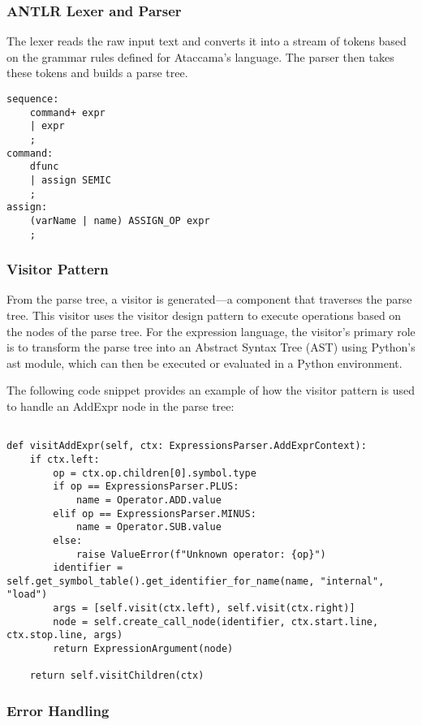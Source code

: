 \subsubsection{ANTLR Lexer and Parser}

The lexer reads the raw input text and converts it into a stream of tokens based on the grammar rules defined for Ataccama’s language. The parser then takes these tokens and builds a parse tree.


\begin{verbatim}
sequence:
    command+ expr
    | expr
    ;
command:
    dfunc
    | assign SEMIC
    ;
assign:
    (varName | name) ASSIGN_OP expr
    ;
\end{verbatim}

\subsubsection{Visitor Pattern}
 From the parse tree, a visitor is generated—a component that traverses the parse tree. This visitor uses the visitor design pattern to execute operations based on the nodes of the parse tree. For the expression language, the visitor's primary role is to transform the parse tree into an Abstract Syntax Tree (AST) using Python’s ast module, which can then be executed or evaluated in a Python environment.

The following code snippet provides an example of how the visitor pattern is used to handle an AddExpr node in the parse tree:

\begin{verbatim}
    
def visitAddExpr(self, ctx: ExpressionsParser.AddExprContext):
    if ctx.left:
        op = ctx.op.children[0].symbol.type
        if op == ExpressionsParser.PLUS:
            name = Operator.ADD.value
        elif op == ExpressionsParser.MINUS:
            name = Operator.SUB.value
        else:
            raise ValueError(f"Unknown operator: {op}")
        identifier = self.get_symbol_table().get_identifier_for_name(name, "internal", "load")
        args = [self.visit(ctx.left), self.visit(ctx.right)]
        node = self.create_call_node(identifier, ctx.start.line, ctx.stop.line, args)
        return ExpressionArgument(node)

    return self.visitChildren(ctx)

\end{verbatim}

\subsubsection{Error Handling}

